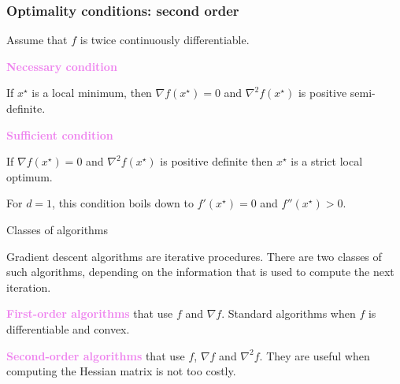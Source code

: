 \documentclass[xcolor={usenames,dvipsnames}]{beamer}
\begin{document}
\begin{frame}
	\frametitle{Optimality conditions: second order}
	
	\large
	
	Assume that $f$ is twice continuously differentiable.
	
	\bigskip
	
\textbf{\textcolor{violet}{Necessary condition}}
	
	\bigskip 
	
	If $x^{\star}$ is a local minimum, then \alert{$\nabla f(x^{\star}) = 0$ and $\nabla^2 f(x^{\star})$ is positive semi-definite}. 
	
	\bigskip
	
	\bigskip
	
\textbf{\textcolor{violet}{Sufficient condition}}
	
	\bigskip 
	
	If \alert{$\nabla f(x^{\star}) = 0$ and $\nabla^2 f(x^{\star})$ is positive definite} then $x^{\star}$ is a strict local optimum. 
	
		\bigskip
	

 For $d=1$, this condition boils down to \alert{$f'(x^{\star}) = 0$ and $f''(x^{\star}) >0$}. 
	
\end{frame}



\begin{frame}{Classes of algorithms}
	
	\large 
	
Gradient descent algorithms are  \alert{iterative procedures}. There are two classes of such algorithms, depending on the information that is used to compute the next iteration. 
	
	\bigskip 
	\bigskip
	
\textbf{\textcolor{violet}{First-order algorithms}} that use $f$ and $\nabla f$. Standard algorithms when $f$ is differentiable and convex. 
	
	\bigskip 
	\bigskip
	
\textbf{\textcolor{violet}{Second-order algorithms}} that use $f$, $\nabla f$ and $\nabla^2f$. They are useful when computing the Hessian matrix is not too costly. 
	
	
\end{frame}
\end{document}
